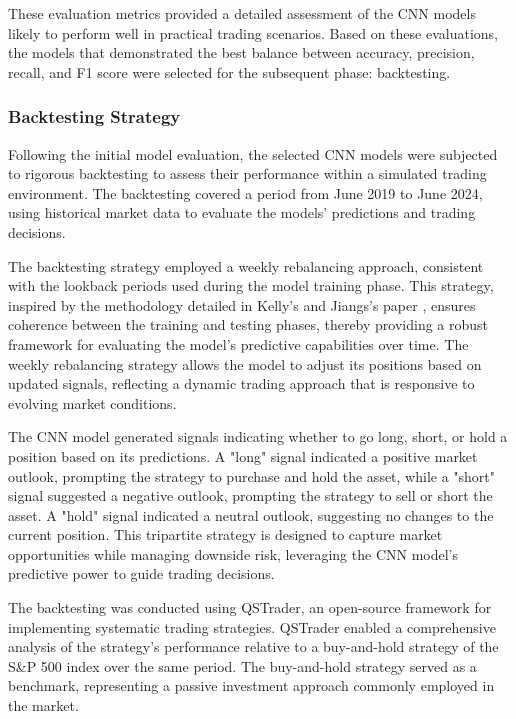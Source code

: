These evaluation metrics provided a detailed assessment of the CNN models likely to perform well in practical trading scenarios. Based on these evaluations, the models that demonstrated the best balance between accuracy, precision, recall, and F1 score were selected for the subsequent phase: backtesting.

\subsubsection{Backtesting Strategy}

Following the initial model evaluation, the selected CNN models were subjected to rigorous backtesting to assess their performance within a simulated trading environment. The backtesting covered a period from June 2019 to June 2024, using historical market data to evaluate the models' predictions and trading decisions.

The backtesting strategy employed a weekly rebalancing approach, consistent with the lookback periods used during the model training phase. This strategy, inspired by the methodology detailed in Kelly's and Jiangs's paper \cite{jiang2023reimagining}, ensures coherence between the training and testing phases, thereby providing a robust framework for evaluating the model's predictive capabilities over time. The weekly rebalancing strategy allows the model to adjust its positions based on updated signals, reflecting a dynamic trading approach that is responsive to evolving market conditions.

The CNN model generated signals indicating whether to go long, short, or hold a position based on its predictions. A "long" signal indicated a positive market outlook, prompting the strategy to purchase and hold the asset, while a "short" signal suggested a negative outlook, prompting the strategy to sell or short the asset. A "hold" signal indicated a neutral outlook, suggesting no changes to the current position. This tripartite strategy is designed to capture market opportunities while managing downside risk, leveraging the CNN model's predictive power to guide trading decisions.

The backtesting was conducted using QSTrader, an open-source framework for implementing systematic trading strategies. QSTrader enabled a comprehensive analysis of the strategy's performance relative to a buy-and-hold strategy of the S\&P 500 index over the same period. The buy-and-hold strategy served as a benchmark, representing a passive investment approach commonly employed in the market.

